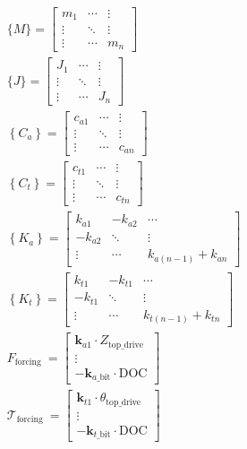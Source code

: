 \begin{equation}\label{12}
  \begin{aligned}
  & \{M\}=\left[\begin{array}{ccc}
  m_1 & \cdots & \vdots \\
  \vdots & \ddots & \vdots \\
  \vdots & \cdots & m_n
  \end{array}\right] \\
  & \{J\}=\left[\begin{array}{ccc}
  J_1 & \cdots & \vdots \\
  \vdots & \ddots & \vdots \\
  \vdots & \cdots & J_n
  \end{array}\right] \\
  & \left\{C_a\right\}=\left[\begin{array}{ccc}
  c_{a 1} & \cdots & \vdots \\
  \vdots & \ddots & \vdots \\
  \vdots & \cdots & c_{a n}
  \end{array}\right] \\
  & \left\{C_t\right\}=\left[\begin{array}{ccc}
  c_{t 1} & \cdots & \vdots \\
  \vdots & \ddots & \vdots \\
  \vdots & \cdots & c_{t n}
  \end{array}\right] \\
  & \left\{K_a\right\}=\left[\begin{array}{ccc}
  k_{a 1} & -k_{a 2} & \cdots \\
  -k_{a 2} & \ddots & \vdots \\
  \vdots & \cdots & k_{a(n-1)}+k_{a n}
  \end{array}\right] \\
  & \left\{K_t\right\}=\left[\begin{array}{ccc}
  k_{t 1} & -k_{t 1} & \cdots \\
  -k_{t 1} & \ddots & \vdots \\
  \vdots & \cdots & k_{t(n-1)}+k_{t n}
  \end{array}\right] \\
  & F_{\text {forcing }}=\left[\begin{array}{c}
  \boldsymbol{k}_{a 1} \cdot Z_{\text {top\_drive}} \\
  \vdots \\
  -\boldsymbol{k}_{a\_\text{bit}} \cdot \text {DOC}
  \end{array}\right] \\
  & \mathcal{T}_{\text {forcing }}=\left[\begin{array}{c}
  \boldsymbol{k}_{t 1} \cdot \theta_{\text {top\_drive}} \\
  \vdots \\
  -\boldsymbol{k}_{t\_\text{bit}} \cdot \text {DOC}
  \end{array}\right]
  \end{aligned}
\end{equation}


